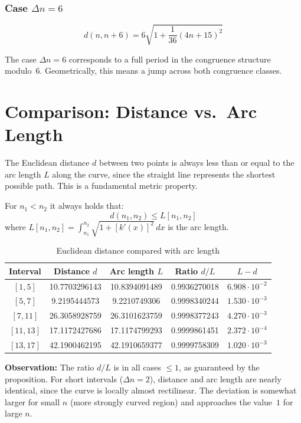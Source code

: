 \subsubsection{Case $\Delta n = 6$}

\begin{equation}
d(n, n+6) = 6\sqrt{1 + \frac{1}{36}(4n + 15)^2}
\end{equation}

\begin{remark}
The case $\Delta n = 6$ corresponds to a full period in the congruence
structure modulo~$6$. Geometrically, this means a jump across both
congruence classes.
\end{remark}

\section{Comparison: Distance vs.\ Arc Length}

The Euclidean distance $d$ between two points is always less than or equal to
the arc length $L$ along the curve, since the straight line represents the
shortest possible path. This is a fundamental metric property.

\begin{proposition}
For $n_1 < n_2$ it always holds that:
\begin{equation}
d(n_1, n_2) \leq L[n_1, n_2]
\end{equation}
where $L[n_1, n_2] = \int_{n_1}^{n_2} \sqrt{1 + [k'(x)]^2}\, dx$ is the arc length.
\end{proposition}

\begin{example}
\begin{table}[H]
\centering
\caption{Euclidean distance compared with arc length}
\begin{tabular}{ccccc}
\toprule
Interval & Distance $d$ & Arc length $L$ & Ratio $d/L$ & $L - d$ \\
\midrule
$[1, 5]$   & 10.7703296143 & 10.8394091489 & 0.9936270018 & $6.908 \cdot 10^{-2}$ \\
$[5, 7]$   &  9.2195444573 &  9.2210749306 & 0.9998340244 & $1.530 \cdot 10^{-3}$ \\
$[7, 11]$  & 26.3058928759 & 26.3101623759 & 0.9998377243 & $4.270 \cdot 10^{-3}$ \\
$[11, 13]$ & 17.1172427686 & 17.1174799293 & 0.9999861451 & $2.372 \cdot 10^{-4}$ \\
$[13, 17]$ & 42.1900462195 & 42.1910659377 & 0.9999758309 & $1.020 \cdot 10^{-3}$ \\
\bottomrule
\end{tabular}
\end{table}

\textbf{Observation:} The ratio $d/L$ is in all cases $\leq 1$, as
guaranteed by the proposition. For short intervals ($\Delta n = 2$), distance
and arc length are nearly identical, since the curve is locally almost
rectilinear. The deviation is somewhat larger for small $n$ (more strongly
curved region) and approaches the value~$1$ for large $n$.
\end{example}

